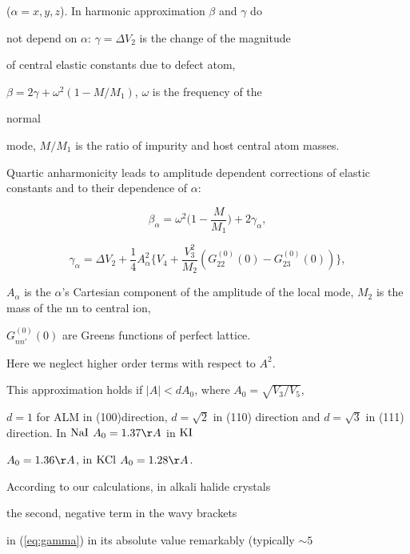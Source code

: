 ($\alpha = x,y,z$). In harmonic approximation $\beta$ and $\gamma$ do 

not depend on $\alpha$: $\gamma = \Delta V_2$ is the change of the magnitude 

of central elastic constants due to defect atom,  

$\beta = 2\gamma+\omega^2 (1-M/M_1)$, $\omega$ is the frequency of the

normal 

mode, $M/M_1$ is the ratio of impurity and host central atom masses.

Quartic 
anharmonicity leads to amplitude dependent corrections of 
elastic constants 
and to their dependence of $\alpha$: 

\[

\beta_{\alpha} = \omega^2{\Big (}1- \frac{M}{M_1}{\Big )}+

2\gamma_{\alpha}, 

\]

\begin{equation}

\gamma_{\alpha} = \Delta V_2+\frac{1}{4}  A^2_{\alpha} {\Big \{ } V_4 +

\frac{V_3^2}{M_2} (G_{22}^{(0)}(0)-G_{23}^{(0)}(0)) {\Big \} }, 

\label{eq:gamma}

\end{equation} 

$A_{\alpha}$ is the $\alpha$'s Cartesian component of the amplitude of 
the 
local mode, $M_2$ is the mass of the nn to central ion, 

$G_{nn'}^{(0)}(0)$  are Greens functions of perfect lattice.

Here we neglect higher order terms with respect to $A^2$. 

This approximation holds if $ |A| < d A_0$, where $A_0=\sqrt{V_3/V_5}$, 

$d=1$
 for ALM in (100)direction, $d=\sqrt{2}$ in (110) direction and $d=\sqrt{3}$
 in (111) direction. In ${\rm NaI}$ $A_0 = 1.37 \AA$ in ${\rm KI}$ 

$A_0 = 1.36 \AA$, in ${\rm KCl}$ $A_0= 1.28 \AA$.

   

According to our calculations, in alkali halide crystals 

the second, negative term in the wavy brackets 

in (\ref{eq:gamma}) in its absolute value remarkably (typically $\sim 5$ 


